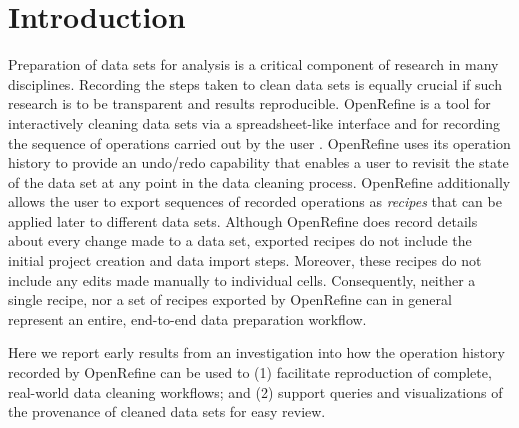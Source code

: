 \section{Introduction}

Preparation of data sets for analysis is a critical component of research in many disciplines. Recording the steps taken to clean data sets is equally crucial if such research is to be transparent and results reproducible. OpenRefine is a tool for interactively cleaning data sets via a spreadsheet-like interface and for recording the sequence of operations carried out by the user \cite{verborgh_using_2013}. OpenRefine uses its operation history to provide an undo/redo capability that enables a user to revisit the state of the data set at any point in the data cleaning process. OpenRefine additionally allows the user to export sequences of recorded operations as \emph{recipes} that can be applied later to different data sets. Although OpenRefine does record details about every change made to a data set, exported recipes do not include the initial project creation and data import steps. Moreover, these recipes do not include any edits made manually to individual cells. Consequently, neither a single recipe, nor a set of recipes exported by OpenRefine can in general represent an entire, end-to-end data preparation workflow. 

Here we report early results from an investigation into how the operation history recorded by OpenRefine can be used to (1) facilitate reproduction of complete, real-world data cleaning workflows; and (2) support queries and visualizations of the provenance of cleaned data sets for easy review.
